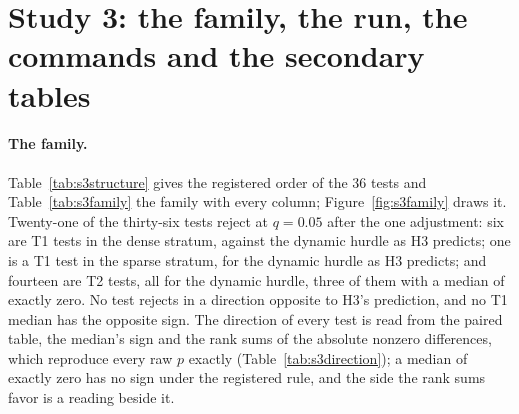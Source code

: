 \providecommand{\lm}{\texttt{local\_mean\_28}}
\providecommand{\qs}{QScore9}
\providecommand{\hc}{\texttt{hurdle\_count\_28}}

\section{Study 3: the family, the run, the commands and the secondary tables}
\label{app:s3tables}

\paragraph{The family.} Table~\ref{tab:s3structure} gives the registered order of the 36 tests and
Table~\ref{tab:s3family} the family with every column; Figure~\ref{fig:s3family} draws it. Twenty-one of
the thirty-six tests reject at $q = 0.05$ after the one adjustment: six are T1 tests in the dense stratum,
against the dynamic hurdle as H3 predicts; one is a T1 test in the sparse stratum, for the dynamic hurdle as
H3 predicts; and fourteen are T2 tests, all for the dynamic hurdle, three of them with a median of exactly
zero. No test rejects in a direction opposite to H3's prediction, and no T1 median has the opposite sign. The
direction of every test is read from the paired table, the median's sign and the rank sums of the absolute
nonzero differences, which reproduce every raw $p$ exactly (Table~\ref{tab:s3direction}); a median of exactly
zero has no sign under the registered rule, and the side the rank sums favor is a reading beside it.

